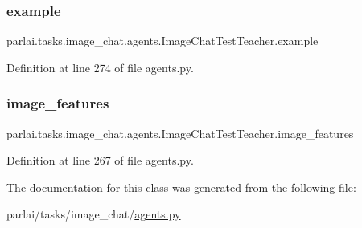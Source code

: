 \subsubsection{\texorpdfstring{example}{example}}
{\footnotesize\ttfamily parlai.\+tasks.\+image\+\_\+chat.\+agents.\+Image\+Chat\+Test\+Teacher.\+example}



Definition at line 274 of file agents.\+py.

\mbox{\label{classparlai_1_1tasks_1_1image__chat_1_1agents_1_1ImageChatTestTeacher_a80425539c895043b514564eb38961bf6}} 
\subsubsection{\texorpdfstring{image\+\_\+features}{image\_features}}
{\footnotesize\ttfamily parlai.\+tasks.\+image\+\_\+chat.\+agents.\+Image\+Chat\+Test\+Teacher.\+image\+\_\+features}



Definition at line 267 of file agents.\+py.



The documentation for this class was generated from the following file\+:\begin{DoxyCompactItemize}
\item 
parlai/tasks/image\+\_\+chat/\hyperlink{parlai_2tasks_2image__chat_2agents_8py}{agents.\+py}\end{DoxyCompactItemize}
